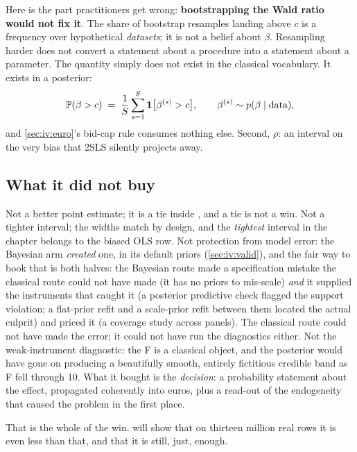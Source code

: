 Here is the part practitioners get wrong: \textbf{bootstrapping the Wald ratio would not
fix it}. The share of bootstrap resamples landing above $c$ is a frequency over hypothetical
\emph{datasets}; it is not a belief about $\beta$. Resampling harder does not convert a statement
about a procedure into a statement about a parameter. The quantity simply does not exist in the
classical vocabulary. It exists in a posterior:
%
\begin{equation}
  \operatorname{\mathbb{P}}(\beta > c) \;=\;
  \frac{1}{S}\sum_{s=1}^{S} \mathbf 1\big[\beta^{(s)} > c\big],
  \qquad \beta^{(s)} \sim p(\beta \mid \text{data}),
  \label{eq:iv:pgt}
\end{equation}
%
and \cref{sec:iv:euro}'s bid-cap rule consumes nothing else. Second, $\rho$: an interval on the very
bias that 2SLS silently projects away.

\subsection*{What it did not buy}

Not a better point estimate; it is a tie inside \eur{\nbElevenTieTol}, and a tie is not a win. Not a
tighter interval; the widths match by design, and the \emph{tightest} interval in the chapter belongs
to the biased OLS row. Not protection from model error: the Bayesian arm \emph{created} one, in
its default priors (\cref{sec:iv:valid}), and the fair way to book that is both
halves: the Bayesian route made a specification mistake the classical route could not have made (it
has no priors to mis-scale) \emph{and} it supplied the instruments that caught it (a posterior
predictive check flagged the support violation; a flat-prior refit and a scale-prior refit between
them located the actual culprit) and priced it (a coverage study across \nbElevenNSeeds{} panels). The
classical route could not have made the error; it could not have run the diagnostics either. Not the
weak-instrument diagnostic: the F is a classical object, and the posterior would have gone on
producing a beautifully smooth, entirely fictitious credible band as F fell through 10. What it
bought is the \emph{decision}: a probability statement about the effect, propagated coherently into
euros, plus a read-out of the endogeneity that caused the problem in the first place.

That is the whole of the win.  will show that on thirteen million real rows it is
even less than that, and that it is still, just, enough.

